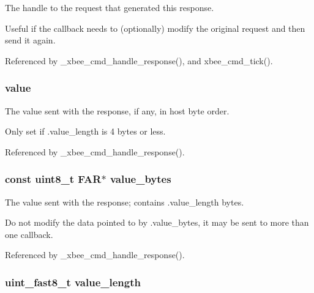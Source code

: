 The handle to the request that generated this response. 

Useful if the callback needs to (optionally) modify the original request and then send it again. 

Referenced by \-\_\-xbee\-\_\-cmd\-\_\-handle\-\_\-response(), and xbee\-\_\-cmd\-\_\-tick().

\hypertarget{structxbee__cmd__response__t_ae7f66047e6e39ba2bb6af8b95f00d1dd}{
\subsubsection[{value}]{ value}}\label{structxbee__cmd__response__t_ae7f66047e6e39ba2bb6af8b95f00d1dd}


The value sent with the response, if any, in host byte order. 

Only set if .value\-\_\-length is 4 bytes or less. 

Referenced by \-\_\-xbee\-\_\-cmd\-\_\-handle\-\_\-response().

\hypertarget{structxbee__cmd__response__t_af6bfa5858cb10700bab8337ebdd26561}{
\subsubsection[{value\-\_\-bytes}]{\setlength{\rightskip}{0pt plus 5cm}const {\bf uint8\-\_\-t} {\bf F\-A\-R}$\ast$ value\-\_\-bytes}}\label{structxbee__cmd__response__t_af6bfa5858cb10700bab8337ebdd26561}


The value sent with the response; contains .value\-\_\-length bytes. 

Do not modify the data pointed to by .value\-\_\-bytes, it may be sent to more than one callback. 

Referenced by \-\_\-xbee\-\_\-cmd\-\_\-handle\-\_\-response().

\hypertarget{structxbee__cmd__response__t_a2c54a515e67816a5056c4526e22a91d9}{
\subsubsection[{value\-\_\-length}]{\setlength{\rightskip}{0pt plus 5cm}uint\-\_\-fast8\-\_\-t value\-\_\-length}}\label{structxbee__cmd__response__t_a2c54a515e67816a5056c4526e22a91d9}


